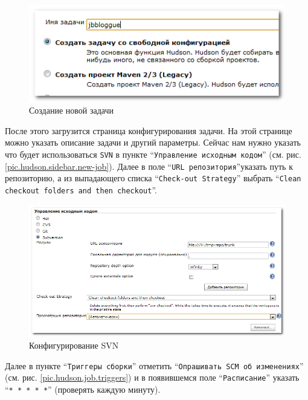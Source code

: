 \documentclass[a4paper,12pt]{article}
\begin{document}
\begin{figure}[h!]
\begin{center}
  \includegraphics[scale = 0.8]{new-job-2.png}
  \vspace{-10pt}
  \caption{Создание новой задачи}
  \label{pic.hudson.job-creation}
\end{center}
\end{figure}

После этого загрузится страница конфигурирования задачи. На этой странице можно указать описание задачи и другий
параметры. Сейчас нам нужно указать что будет использоваться \texttt{SVN} в пункте ``\texttt{Управление исходным
кодом}'' (см.
рис.
\ref{pic.hudson.sidebar.new-job}). Далее в поле ``\texttt{URL репозитория}''указать путь к репозиторию, а из выпадающего
списка ``\texttt{Check-out Strategy}'' выбрать ``\texttt{Clean checkout folders and then checkout}''.

\begin{figure}[htp]
\begin{center}
  \includegraphics[scale = 0.8]{new-job-3.png}
  \caption[labelInTOC]{Конфигурирование SVN}
  \label{pic.hudson.job.svn}
\end{center}
\end{figure}

Далее в пункте ``\texttt{Триггеры сборки}'' отметить ``\texttt{Опрашивать SCM об изменениях}'' (см. рис.
\ref{pic.hudson.job.triggers}) и в появившемся поле ``\texttt{Расписание}'' указать ``\texttt{* * * * *}'' (проверять
каждую минуту).
\end{document}
